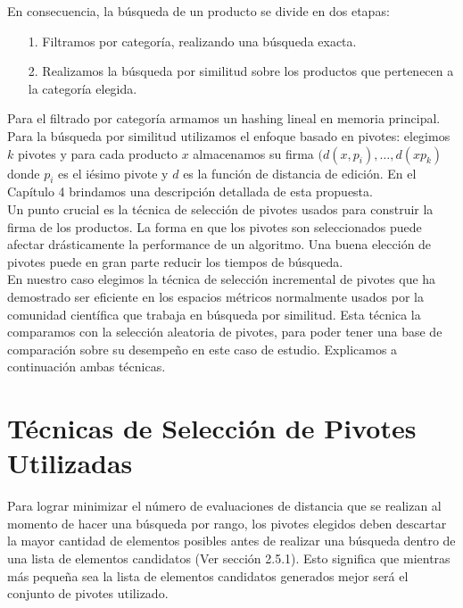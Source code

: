 En consecuencia, la b\'usqueda de un producto se divide en dos etapas: 
\begin{itemize}
    \item [1.] Filtramos por categor\'ia, realizando una búsqueda exacta.
    \item [2.] Realizamos la b\'usqueda por similitud sobre los productos que pertenecen a la categor\'ia elegida.
 \end{itemize}
 
Para el filtrado por categor\'ia armamos un hashing lineal en memoria principal. Para la búsqueda por similitud utilizamos el enfoque basado en pivotes: elegimos $k$ pivotes y para cada producto $x$ almacenamos su firma $(d(x,p_i), \ldots, d(xp_k)$ donde $p_i$ es el i\'esimo pivote y $d$ es la funci\'on de distancia de edici\'on. En el Cap\'itulo 4 brindamos una descripci\'on detallada de esta propuesta.\\
 
Un punto crucial es la t\'ecnica de selecci\'on de pivotes usados para construir la firma de los productos. La forma en que los pivotes son seleccionados puede afectar dr\'asticamente la performance de un algoritmo. Una buena elecci\'on de pivotes puede en gran parte reducir los tiempos de b\'usqueda.\\
 
En nuestro caso elegimos la t\'ecnica de selecci\'on incremental de pivotes \cite{} que ha demostrado ser eficiente en los espacios m\'etricos  normalmente usados por la comunidad cient\'ifica que trabaja en b\'usqueda por similitud. Esta t\'ecnica la comparamos con la selecci\'on aleatoria de pivotes, para poder tener una base de comparaci\'on sobre su desempeño en este caso de estudio. Explicamos a continuaci\'on ambas t\'ecnicas.\\
 
\section{T\'ecnicas de Selecci\'on de Pivotes Utilizadas}
 

Para lograr minimizar el n\'umero de evaluaciones de distancia que se realizan al momento de hacer una b\'usqueda por rango, los pivotes elegidos deben descartar la mayor cantidad de elementos posibles antes de realizar una b\'usqueda dentro de una lista de elementos candidatos (Ver secci\'on 2.5.1). Esto significa que mientras más peque\~na sea la lista de elementos candidatos generados mejor ser\'a el conjunto de pivotes utilizado. \\

